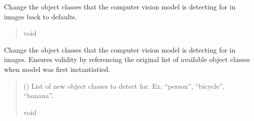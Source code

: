 \documentclass[letterpaper,10pt,english]{sphinxmanual}
\begin{document}
\begin{fulllineitems}
\begin{fulllineitems}
\end{fulllineitems}


\begin{fulllineitems}
\label{\detokenize{comp_viz.object_detection:comp_viz.object_detection.model.Model.reset_classes}}
\pysigstartsignatures
{}
\pysigstopsignatures
\sphinxAtStartPar
Change the object classes that the computer vision model is detecting for in images back to defaults.
\begin{quote}\begin{description}
\sphinxAtStartPar
void

\end{description}\end{quote}

\end{fulllineitems}


\begin{fulllineitems}
\label{\detokenize{comp_viz.object_detection:comp_viz.object_detection.model.Model.set_classes}}
\pysigstartsignatures
{}
\pysigstopsignatures
\sphinxAtStartPar
Change the object classes that the computer vision model is detecting for in images. Ensures validity by referencing the original list of available object classes when model was first instantiatied.
\begin{quote}\begin{description}
\sphinxAtStartPar
{} () \textendash{} List of new object classes to detect for. Ex. “person”, “bicycle”, “banana”.

\sphinxAtStartPar
void

\end{description}\end{quote}

\end{fulllineitems}


\end{fulllineitems}
\end{document}
